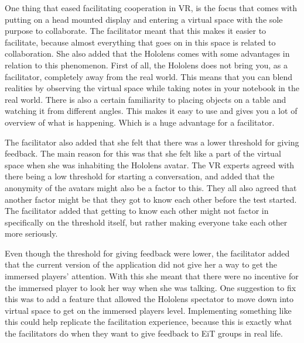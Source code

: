         One thing that eased facilitating cooperation in VR, is the focus that comes with putting on a head mounted display and entering a virtual space with the sole purpose to collaborate. The facilitator meant that this makes it easier to facilitate, because almost everything that goes on in this space is related to collaboration. She also added that the Hololens comes with some advantages in relation to this phenomenon. First of all, the Hololens does not bring you, as a facilitator, completely away from the real world. This means that you can blend realities by observing the virtual space while taking notes in your notebook in the real world. There is also a certain familiarity to placing objects on a table and watching it from different angles. This makes it easy to use and gives you a lot of overview of what is happening. Which is a huge advantage for a facilitator.
        
        The facilitator also added that she felt that there was a lower threshold for giving feedback. The main reason for this was that she felt like a part of the virtual space when she was inhabiting the Hololens avatar. The VR experts agreed with there being a low threshold for starting a conversation, and added that the anonymity of the avatars might also be a factor to this. They all also agreed that another factor might be that they got to know each other before the test started. The facilitator added that getting to know each other might not factor in specifically on the threshold itself, but rather making everyone take each other more seriously.
        
        Even though the threshold for giving feedback were lower, the facilitator added that the current version of the application did not give her a way to get the immersed players' attention. With this she meant that there were no incentive for the immersed player to look her way when she was talking. One suggestion to fix this was to add a feature that allowed the Hololens spectator to move down into virtual space to get on the immersed players level. Implementing something like this could help replicate the facilitation experience, because this is exactly what the facilitators do when they want to give feedback to EiT groups in real life.
        
